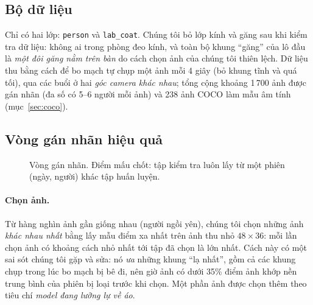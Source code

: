 \documentclass[12pt,a4paper]{article}
\begin{document}
\subsection{Bộ dữ liệu}

Chỉ có hai lớp: \texttt{person} và \texttt{lab\_coat}. Chúng tôi bỏ lớp kính và găng sau khi kiểm tra dữ liệu: không ai
trong phòng đeo kính, và toàn bộ khung ``găng'' của lô đầu là \emph{một đôi găng nằm trên bàn} do cách chọn ảnh của
chúng tôi thiên lệch. Dữ liệu thu bằng cách để bo mạch tự chụp một ảnh mỗi 4 giây (bỏ khung tĩnh và quá tối), qua
các buổi ở hai \emph{góc camera khác nhau}; tổng cộng khoảng 1\,700 ảnh được gán nhãn (đa số có 5--6 người mỗi ảnh)
và 238 ảnh COCO làm mẫu âm tính (mục~\ref{sec:coco}).

\subsection{Vòng gán nhãn hiệu quả}

\begin{figure}[ht]
\centering
{}
\caption{Vòng gán nhãn. Điểm mấu chốt: tập kiểm tra luôn lấy từ một phiên (ngày, người) khác tập huấn luyện.}
\label{fig:loop}
\end{figure}

\paragraph{Chọn ảnh.} Từ hàng nghìn ảnh gần giống nhau (người ngồi yên), chúng tôi chọn những ảnh \emph{khác nhau nhất}
bằng lấy mẫu điểm xa nhất trên ảnh thu nhỏ $48{\times}36$: mỗi lần chọn ảnh có khoảng cách nhỏ nhất tới tập đã chọn là
lớn nhất. Cách này có một sai sót chúng tôi gặp và sửa: nó \emph{ưa} những khung ``lạ nhất'', gồm cả các khung chụp
trong lúc bo mạch bị bê đi, nên giờ ảnh có dưới 35\% điểm ảnh khớp nền trung bình của phiên bị loại trước khi chọn.
Một phần ảnh được chọn thêm theo tiêu chí \emph{model đang lưỡng lự về áo}.
\end{document}
